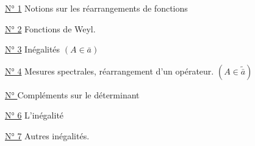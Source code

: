 \uline{N° 1} Notions sur les réarrangements de fonctions

\uline{N° 2} Fonctions de Weyl.

\uline{N° 3} Inégalités 
\((A\in\bar a)\)

\uline{N° 4} Mesures spectrales, réarrangement  d'un opérateur. \((A\in\widetilde{\bar a})\)


\uline{N° } Compléments sur le déterminant

\uline{N° 6} L'inégalité 

\uline{N° 7} Autres inégalités.

